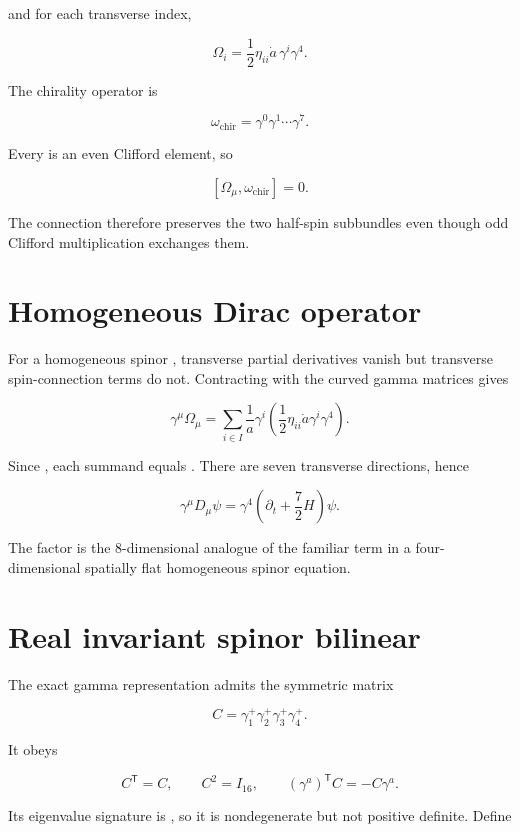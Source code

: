 \documentclass[11pt]{article}
\begin{document}
and for each transverse index,

\[
\boxed{
\Omega_i=\frac12\eta_{ii}\dot a\,\gamma^i\gamma^4.}
\]

The chirality operator is

\[
\omega_{\mathrm{chir}}
=\gamma^0\gamma^1\cdots\gamma^7.
\]

Every \texttt{} is an even Clifford element, so

\[
[\Omega_\mu,\omega_{\mathrm{chir}}]=0.
\]

The connection therefore preserves the two half-spin subbundles even though odd Clifford multiplication exchanges them.

\section{Homogeneous Dirac operator}

For a homogeneous spinor \texttt{}, transverse partial derivatives vanish but transverse spin-connection terms do not. Contracting with the curved gamma matrices gives

\[
\gamma^\mu\Omega_\mu
=\sum_{i\in I}\frac1a\gamma^i
\left(\frac12\eta_{ii}\dot a\gamma^i\gamma^4\right).
\]

Since \texttt{}, each summand equals \texttt{}. There are seven transverse directions, hence

\[
\boxed{
\gamma^\mu D_\mu\psi
=\gamma^4\left(\partial_t+\frac72H\right)\psi.}
\]

The factor \texttt{} is the 8-dimensional analogue of the familiar \texttt{} term in a four-dimensional spatially flat homogeneous spinor equation.

\section{Real invariant spinor bilinear}

The exact gamma representation admits the symmetric matrix

\[
C=\gamma_1^+\gamma_2^+\gamma_3^+\gamma_4^+.
\]

It obeys

\[
C^{\mathsf T}=C,
\qquad C^2=I_{16},
\qquad
(\gamma^a)^{\mathsf T}C=-C\gamma^a.
\]

Its eigenvalue signature is \texttt{}, so it is nondegenerate but not positive definite. Define
\end{document}
